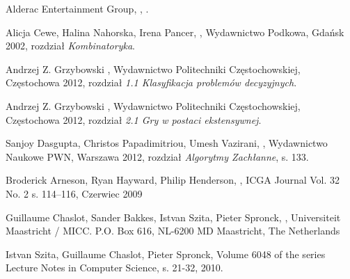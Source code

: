 \documentclass[11pt]{aghdpl}
\author{Damian Malarczyk}
\date{2016}
\begin{document}
\titlepages
\setcounter{tocdepth}{3}
\tableofcontents
\clearpage










\begin{thebibliography}{1}

\bibitem{}
\label{bib:loveLetterGame}
Alderac Entertainment Group,
,
.

\bibitem{}
\label{bib:tabliceMatematyczne}
Alicja Cewe, Halina Nahorska, Irena Pancer,
,
\newblock Wydawnictwo Podkowa, Gdańsk 2002,
\newblock rozdział {\em Kombinatoryka}.

\bibitem{}
\label{bib:matematyczneModeleKonfliktu_klasyfikacja}
Andrzej Z. Grzybowski
,
\newblock Wydawnictwo Politechniki Częstochowskiej, Częstochowa 2012,
\newblock rozdział {\em 1.1 Klasyfikacja problemów decyzyjnych}.

\bibitem{}
\label{bib:matematyczneModeleKonfliktu_graEkstensywna}
Andrzej Z. Grzybowski
,
\newblock Wydawnictwo Politechniki Częstochowskiej, Częstochowa 2012,
\newblock rozdział {\em 2.1 Gry w postaci ekstensywnej}.

\bibitem{}
\label{bib:algorytmy_zachlanny}
Sanjoy Dasgupta, Christos Papadimitriou, Umesh Vazirani,
,
\newblock Wydawnictwo Naukowe PWN, Warszawa 2012,
\newblock rozdział {\em Algorytmy Zachłanne}, s. 133.

\bibitem{}
\label{bib:mcts_hex}
Broderick Arneson, Ryan Hayward, Philip Henderson,
,
\newblock ICGA Journal Vol. 32 No. 2 s. 114–116, Czerwiec 2009

\bibitem{}
\label{bib:mcts_opis}
Guillaume Chaslot, Sander Bakkes, Istvan Szita, Pieter Spronck,
,
\newblock Universiteit Maastricht / MICC.
\newblock P.O. Box 616, NL-6200 MD Maastricht, The Netherlands

\bibitem{}
\label{bib:mcts_osadnicy}
Istvan Szita, Guillaume Chaslot, Pieter Spronck,
\newblock Volume 6048 of the series Lecture Notes in Computer Science, s. 21-32, 2010.


\end{thebibliography}
\end{document}
